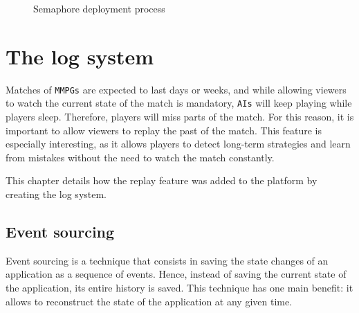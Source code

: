 \documentclass[a4paper,11pt,titlepage,abstract,numbers=noenddot,automark,mnsy,intlimits,rgb,dvipsnames]{report}
\begin{document}
\begin{figure}[H]
\begin{center}
\noindent{}
\end{center}
\caption{Semaphore deployment process}
\label{deployment_process}
\end{figure}
\chapter{The log system}
\label{log_system}
Matches of \texttt{MMPGs} are expected to last days or weeks, and while allowing viewers to watch the current state of
the match is mandatory, \texttt{AIs} will keep playing while players sleep. Therefore, players will miss parts of the match.
For this reason, it is important to allow viewers to replay the past of the match. This feature is especially
interesting, as it allows players to detect long-term strategies and learn from mistakes without the need to watch the
match constantly.

This chapter details how the replay feature was added to the platform by creating the log system.
\section{Event sourcing}
Event sourcing \cite{event_sourcing} is a technique that consists in saving the state changes of an application as a
sequence of events. Hence, instead of saving the current state of the application, its entire history is saved. This technique
has one main benefit: it allows to reconstruct the state of the application at any given time.
\end{document}
